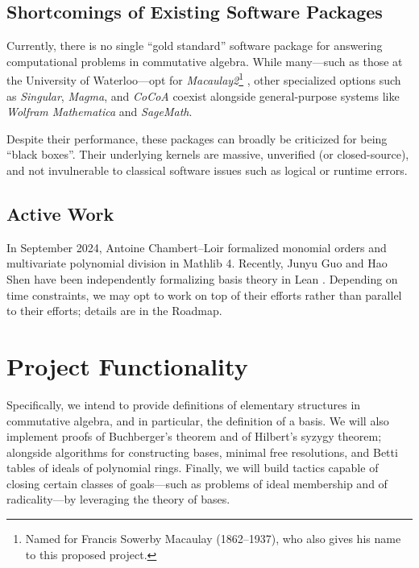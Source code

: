 \documentclass[acmsmall,nonacm,screen]{acmart}
\begin{document}
\subsection{Shortcomings of Existing Software Packages}

Currently, there is no single ``gold standard'' software package for answering computational problems in commutative algebra.
While many---such as those at the University of Waterloo---opt for {\it Macaulay2}\footnote{Named for Francis Sowerby Macaulay (1862--1937), who also gives his name to this proposed project.} \cite{Macaulay2}, other specialized options such as {\it Singular}, {\it Magma}, and {\it CoCoA} coexist alongside general-purpose systems like {\it Wolfram Mathematica} and {\it SageMath}.

Despite their performance, these packages can broadly be criticized for being ``black boxes''.
Their underlying kernels are massive, unverified (or closed-source), and not invulnerable to classical software issues such as logical or runtime errors.

\subsection{Active Work}

In September 2024, Antoine Chambert--Loir formalized monomial orders and multivariate polynomial division in Mathlib 4.
Recently, Junyu Guo and Hao Shen have been independently formalizing \Groebner{} basis theory in Lean \cite{GroebnerLean}.
Depending on time constraints, we may opt to work on top of their efforts rather than parallel to their efforts; details are in the Roadmap.

\section{Project Functionality}


Specifically, we intend to provide definitions of elementary structures in commutative algebra, and in particular, the definition of a \Groebner{} basis.
We will also implement proofs of Buchberger's theorem and of Hilbert's syzygy theorem; alongside algorithms for constructing \Groebner{} bases, minimal free resolutions, and Betti tables of ideals of polynomial rings.
Finally, we will build tactics capable of closing certain classes of goals---such as problems of ideal membership and of radicality---by leveraging the theory of \Groebner{} bases.
\end{document}
